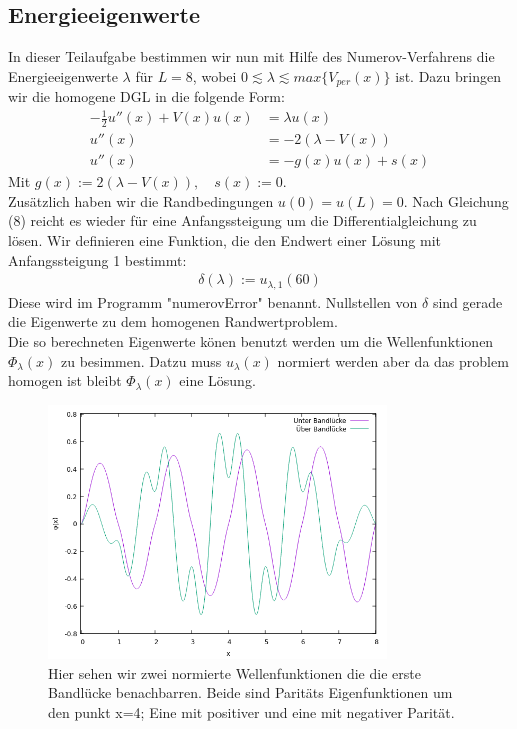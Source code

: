 \documentclass[ngerman]{scrartcl}
\begin{document}
\subsection{Energieeigenwerte}
	In dieser Teilaufgabe bestimmen wir nun mit Hilfe des Numerov-Verfahrens die Energieeigenwerte $\lambda$ für $L = 8$,
	wobei $0 \lesssim \lambda \lesssim max \{V_{per}(x)\}$ ist.
	Dazu bringen wir die homogene DGL in die folgende Form:
	\begin{align*}
		-\frac{1}{2}u''(x)+V(x)u(x)&=\lambda u(x)\\
		u''(x)&=-2(\lambda-V(x))\\
		u''(x)&=- g(x) u(x)+s(x)
	\end{align*}
	Mit $g(x):= 2(\lambda-V(x)),\quad s(x):=0$.\\
	Zusätzlich haben wir die Randbedingungen $u(0) = u(L) = 0$.
	Nach Gleichung (8) reicht es wieder für eine Anfangssteigung um die Differentialgleichung zu lösen.
	Wir definieren eine Funktion, die den Endwert einer Lösung mit Anfangssteigung 1 bestimmt:
	\begin{align}
		\delta(\lambda):= u_{\lambda,1}(60)
	\end{align}
	Diese wird im Programm "numerovError" benannt.
	Nullstellen von $\delta$ sind gerade die Eigenwerte zu dem homogenen Randwertproblem.\\
	Die so berechneten Eigenwerte könen benutzt werden um die Wellenfunktionen $\Phi_\lambda(x)$ zu besimmen.
	Datzu muss $u_\lambda(x)$ normiert werden aber da das problem homogen ist bleibt $\Phi_\lambda(x)$ eine Lösung.
	\begin{figure}[htbp]
		\centering
		\includegraphics[width=0.8\textwidth]{code/wellen_plot.png}
		\caption[$f{ext}$]{
			Hier sehen wir zwei normierte Wellenfunktionen die die erste Bandlücke benachbarren.
			Beide sind Paritäts Eigenfunktionen um den punkt x=4; Eine mit positiver und eine mit negativer Parität.
		}
		\label{fig:8.1}
	\end{figure}
\end{document}
